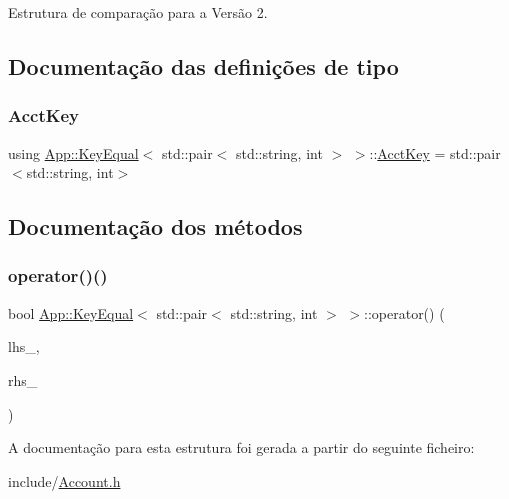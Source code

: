 Estrutura de comparação para a Versão 2. 

\subsection{Documentação das definições de tipo}
\mbox{\label{structApp_1_1KeyEqual_3_01std_1_1pair_3_01std_1_1string_00_01int_01_4_01_4_adad4d74d01c5e80289810a666b1880e7}} 
\subsubsection{\texorpdfstring{Acct\+Key}{AcctKey}}
{\footnotesize\ttfamily using \hyperlink{structApp_1_1KeyEqual}{App\+::\+Key\+Equal}$<$ std\+::pair$<$ std\+::string, int $>$ $>$\+::\hyperlink{structApp_1_1KeyEqual_3_01std_1_1pair_3_01std_1_1string_00_01int_01_4_01_4_adad4d74d01c5e80289810a666b1880e7}{Acct\+Key} =  std\+::pair$<$std\+::string, int$>$}



\subsection{Documentação dos métodos}
\mbox{\label{structApp_1_1KeyEqual_3_01std_1_1pair_3_01std_1_1string_00_01int_01_4_01_4_aea6094ec599a3412f2f8b768f629d4f4}} 
\subsubsection{\texorpdfstring{operator()()}{operator()()}}
{\footnotesize\ttfamily bool \hyperlink{structApp_1_1KeyEqual}{App\+::\+Key\+Equal}$<$ std\+::pair$<$ std\+::string, int $>$ $>$\+::operator() (\begin{DoxyParamCaption}\item[{const \hyperlink{structApp_1_1KeyEqual_3_01std_1_1pair_3_01std_1_1string_00_01int_01_4_01_4_adad4d74d01c5e80289810a666b1880e7}{Acct\+Key} \&}]{lhs\+\_\+,  }\item[{const \hyperlink{structApp_1_1KeyEqual_3_01std_1_1pair_3_01std_1_1string_00_01int_01_4_01_4_adad4d74d01c5e80289810a666b1880e7}{Acct\+Key} \&}]{rhs\+\_\+ }\end{DoxyParamCaption})\hspace{0.3cm}{\ttfamily [inline]}}



A documentação para esta estrutura foi gerada a partir do seguinte ficheiro\+:\begin{DoxyCompactItemize}
\item 
include/\hyperlink{Account_8h}{Account.\+h}\end{DoxyCompactItemize}
